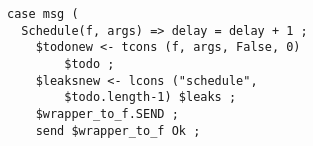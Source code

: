 \begin{lstlisting}[basicstyle=\small\ttfamily, frame=single]
case msg (
  Schedule(f, args) => delay = delay + 1 ;
    $todonew <- tcons (f, args, False, 0) 
	    $todo ;
    $leaksnew <- lcons ("schedule", 
	    $todo.length-1) $leaks ;
    $wrapper_to_f.SEND ;
    send $wrapper_to_f Ok ;
\end{lstlisting}
